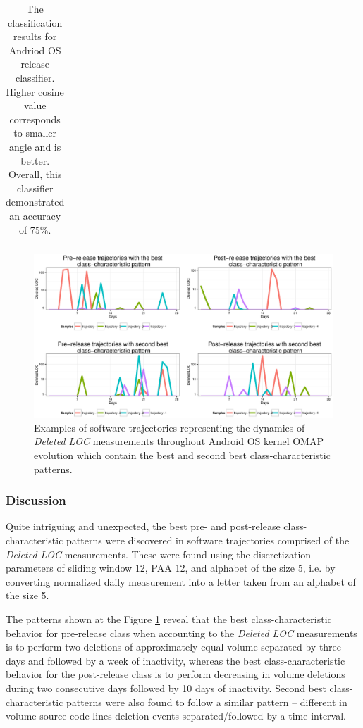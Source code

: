 {\begin{table}[t!]
{{\begin{minipage}[b]{0.47\hsize}
\begin{tabular}{l c c c}
\bottomrule
\end{tabular}
\end{minipage}%
\caption{The classification results for Andriod OS release classifier. Higher cosine value corresponds to smaller angle 
and is better. Overall, this classifier demonstrated an accuracy of 75\%.}
\label{android_table3}
}}
\end{table}
\begin{figure}[h!]
   \centering
   \includegraphics[width=150mm]{figures/omap_deleted_lines_patterns_plot.eps}
   \caption{Examples of software trajectories representing the dynamics of \textit{Deleted LOC} measurements throughout Android OS kernel OMAP evolution which contain the best and second best class-characteristic patterns.}
   \label{fig:OMAP_patterns}
\end{figure}
} %

\subsubsection{Discussion}
Quite intriguing and unexpected, the best pre- and post-release class-characteristic patterns were discovered in software trajectories comprised of the \textit{Deleted LOC} measurements. These were found using the discretization parameters of sliding window 12, PAA 12, and alphabet of the size 5, i.e. by converting normalized daily measurement into a letter taken from an alphabet of the size 5. 

The patterns shown at the Figure \ref{fig:OMAP_patterns} reveal that the best class-characteristic behavior for pre-release class when accounting to the \textit{Deleted LOC} measurements is to perform two deletions of approximately equal volume separated by three days and followed by a week of inactivity, whereas the best class-characteristic behavior for the post-release class is to perform decreasing in volume deletions during two consecutive days followed by 10 days of inactivity. Second best class-characteristic patterns were also found to follow a similar pattern -- different in volume source code lines deletion events separated/followed by a time interval.


